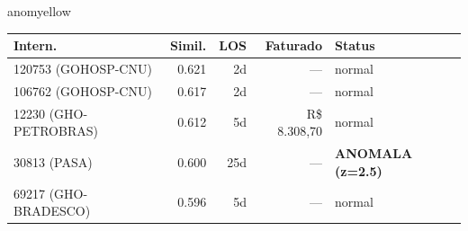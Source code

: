 \documentclass[a4paper,10pt]{article}
\begin{document}
\begin{anomalycard}[Internacao 171028 | PASA | MODERADO (z=2.28)]{anomyellow}
\begin{tabular}{l r r r l}\toprule\textbf{Intern.} & \textbf{Simil.} & \textbf{LOS} & \textbf{Faturado} & \textbf{Status} \\\midrule
120753 (GOHOSP-CNU) & 0.621 & 2d & --- & \textcolor{jcubeblue}{normal} \\
106762 (GOHOSP-CNU) & 0.617 & 2d & --- & \textcolor{jcubeblue}{normal} \\
12230 (GHO-PETROBRAS) & 0.612 & 5d & R\$ 8.308,70 & \textcolor{jcubeblue}{normal} \\
30813 (PASA) & 0.600 & 25d & --- & \textcolor{anomred}{\textbf{ANOMALA (z=2.5)}} \\
69217 (GHO-BRADESCO) & 0.596 & 5d & --- & \textcolor{jcubeblue}{normal} \\
\bottomrule\end{tabular}


\end{anomalycard}

\newpage
\end{document}

